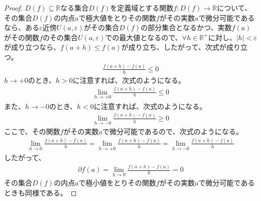 \documentclass[dvipdfmx]{jsarticle}
\begin{document}
\begin{proof}
$D(f) \subseteq \mathbb{R}$なる集合$D(f)$を定義域とする関数$f:D(f) \rightarrow \mathbb{R}$について、その集合$D(f)$の内点$a$で極大値をとりその関数$f$がその実数$a$で微分可能であるなら、ある$\varepsilon$近傍$U(a,\varepsilon)$がその集合$D(f)$の部分集合となるかつ、実数$f(a)$がその関数$f$のその集合$U(a,\varepsilon)$での最大値となるので、$\forall h \in \mathbb{R}^{+}$に対し、$|h| < \varepsilon$が成り立つなら、$f(a + h) \leq f(a)$が成り立ち、したがって、次式が成り立つ。
\begin{align*}
\frac{f(a + h) - f(a)}{h} \leq 0
\end{align*}
$h \rightarrow + 0$のとき、$h > 0$に注意すれば、次式のようになる。
\begin{align*}
\lim_{h \rightarrow + 0}\frac{f(a + h) - f(a)}{h} \leq 0
\end{align*}
また、$h \rightarrow - 0$のとき、$h < 0$に注意すれば、次式のようになる。
\begin{align*}
\lim_{h \rightarrow - 0}\frac{f(a + h) - f(a)}{h} \geq 0
\end{align*}
ここで、その関数$f$がその実数$a$で微分可能であるので、次式のようになる。
\begin{align*}
\lim_{h \rightarrow 0}\frac{f(a + h) - f(a)}{h} = \lim_{h \rightarrow + 0}\frac{f(a + h) - f(a)}{h} = \lim_{h \rightarrow - 0}\frac{f(a + h) - f(a)}{h}
\end{align*}
したがって、
\begin{align*}
\partial f(a) = \lim_{h \rightarrow 0}\frac{f(a + h) - f(a)}{h} = 0
\end{align*}
その集合$D(f)$の内点$a$で極小値をとりその関数$f$がその実数$a$で微分可能であるときも同様である。
\end{proof}
\end{document}
